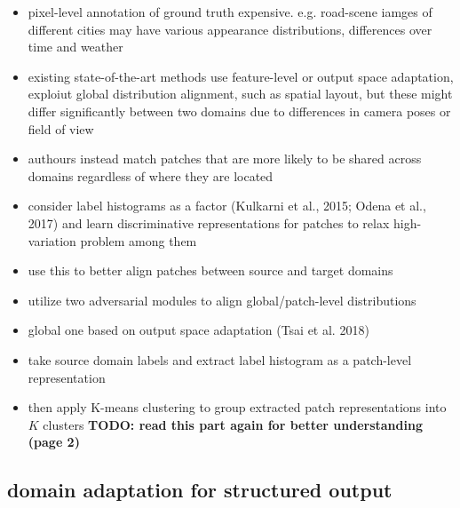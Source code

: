 \documentclass[]{article}
\newcommand{\todo}[1]{{\color{red}\bf{TODO: #1}}}
\begin{document}
\begin{itemize}
	\item pixel-level annotation of ground truth expensive. e.g. road-scene iamges of different cities may have various appearance distributions, differences over time and weather
	\item existing state-of-the-art methods use feature-level or output space adaptation, exploiut global distribution alignment, such as spatial layout, but these might differ significantly between two domains due to differences in camera poses or field of view
	\item authours instead match patches that are more likely to be shared across domains regardless of where they are located
	\item consider label histograms as a factor (Kulkarni et al., 2015; Odena et al., 2017) and learn discriminative representations for patches to relax high-variation problem among them
	\item use this to better align patches between source and target domains
	\item utilize two adversarial modules to align global/patch-level distributions
	\item global one based on output space adaptation (Tsai et al. 2018)
	\item take source domain labels and extract label histogram as a patch-level representation
	\item then apply K-means clustering to group extracted patch representations into $K$ clusters \todo{read this part again for better understanding (page 2)}
\end{itemize}

\subsection{domain adaptation for structured output}
\end{document}
